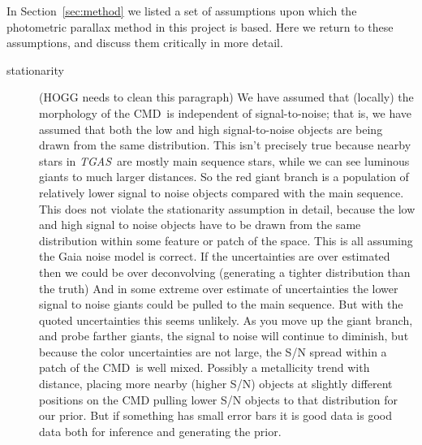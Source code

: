 \documentclass[modern]{aastex61}
\newcommand{\acronym}[1]{{\small{#1}}}
\newcommand{\project}[1]{\textsl{#1}}
\newcommand{\tgas}{\project{\acronym{TGAS}}}
\newcommand{\cmd}{\acronym{CMD}}
\begin{document}
In Section~\ref{sec:method} we listed a set of assumptions upon which
the photometric parallax method in this project is based.
Here we return to these assumptions, and discuss them critically in more
detail.
\begin{description}
\item[stationarity] (HOGG needs to clean this paragraph)
  We have assumed that (locally) the morphology of
  the \cmd\ is independent of signal-to-noise; that is, we have assumed that
  both the low and high
  signal-to-noise objects are being drawn from the same distribution.
  This isn't precisely true because nearby stars in \tgas\ are
  mostly main sequence stars, while we can see luminous giants to much larger
  distances. So the red giant branch is a population of
  relatively lower signal to noise objects compared with the main
  sequence. This does not violate the stationarity assumption in
  detail, because the low and high signal to noise objects have to be
  drawn from the same distribution within some feature or patch of the
  space. This is all assuming the Gaia noise model is correct. If the
  uncertainties are over estimated then we could be over deconvolving
  (generating a tighter distribution than the truth) And in some
  extreme over estimate of uncertainties the lower signal to noise
  giants could be pulled to the main sequence. But with the quoted
  uncertainties this seems unlikely. As you move up the giant branch,
  and probe farther giants, the signal to noise will continue to
  diminish, but because the color uncertainties are not large, the S/N
  spread within a patch of the \cmd\ is well mixed. Possibly a
  metallicity trend with distance, placing more nearby (higher S/N)
  objects at slightly different positions on the CMD pulling lower S/N
  objects to that distribution for our prior. But if something has
  small error bars it is good data is good data both for inference and
  generating the prior.


\end{description}
\end{document}
